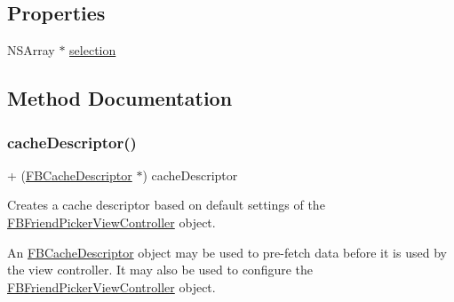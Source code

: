 \subsection*{Properties}
\begin{DoxyCompactItemize}
\item 
N\+S\+Array $\ast$ \hyperlink{interfaceFBFriendPickerViewController_a161cab82f17247a9ad90828ef6ab5aa5}{selection}
\end{DoxyCompactItemize}


\subsection{Method Documentation}
\mbox{\label{interfaceFBFriendPickerViewController_afdb5497a310ae6cdc8ede333659a33dd}} 
\subsubsection{\texorpdfstring{cache\+Descriptor()}{cacheDescriptor()}\hspace{0.1cm}{\footnotesize\ttfamily [1/5]}}
{\footnotesize\ttfamily + (\hyperlink{interfaceFBCacheDescriptor}{F\+B\+Cache\+Descriptor} $\ast$) cache\+Descriptor \begin{DoxyParamCaption}{ }\end{DoxyParamCaption}}

Creates a cache descriptor based on default settings of the {\ttfamily \hyperlink{interfaceFBFriendPickerViewController}{F\+B\+Friend\+Picker\+View\+Controller}} object.

An {\ttfamily \hyperlink{interfaceFBCacheDescriptor}{F\+B\+Cache\+Descriptor}} object may be used to pre-\/fetch data before it is used by the view controller. It may also be used to configure the {\ttfamily \hyperlink{interfaceFBFriendPickerViewController}{F\+B\+Friend\+Picker\+View\+Controller}} object. \mbox{\label{interfaceFBFriendPickerViewController_afdb5497a310ae6cdc8ede333659a33dd}} 
